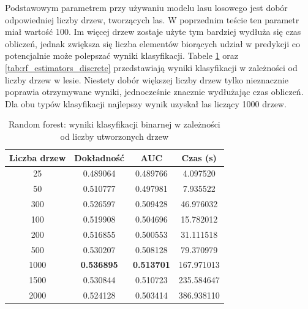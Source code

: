 \documentclass[a4paper, twoside, 11pt, openright]{article}
\begin{document}
Podstawowym parametrem przy używaniu modelu lasu losowego jest dobór odpowiedniej liczby drzew, tworzących las. W poprzednim teście ten parametr miał wartość 100. Im więcej drzew zostaje użyte tym bardziej wydłuża się czas obliczeń, jednak zwiększa się liczba elementów biorących udział w predykcji co potencjalnie może polepszać wyniki klasyfikacji. Tabele \ref{tab:rf_estimators_binary} oraz \ref{tab:rf_estimators_discrete} przedstawiają wyniki klasyfikacji w zależności od liczby drzew w lesie. Niestety dobór większej liczby drzew tylko nieznacznie poprawia otrzymywane wyniki, jednocześnie znacznie wydłużając czas obliczeń. Dla obu typów klasyfikacji najlepszy wynik uzyskał las liczący 1000 drzew.

\begin{table}[H]
    \centering
    \begin{tabular}{|c|c|c|c|}
    \hline
        \textbf{Liczba drzew} & \textbf{Dokładność} & \textbf{AUC} & \textbf{Czas (s)} \\ \hline
25         &  0.489064 &  0.489766 &    4.097520 \\ \hline
50         &  0.510777 &  0.497981 &    7.935522 \\ \hline
300        &  0.526597 &  0.509428 &   46.976032 \\ \hline
100        &  0.519908 &  0.504696 &   15.782012 \\ \hline
200        &  0.516855 &  0.500553 &   31.111518 \\ \hline
500        &  0.530207 &  0.508128 &   79.370979 \\ \hline
1000       &  \textbf{0.536895} &  \textbf{0.513701} &  167.971013 \\ \hline
1500       &  0.530844 &  0.510723 &  235.584647 \\ \hline
2000       &  0.524128 &  0.503414 &  386.938110 \\ \hline
    \end{tabular}
    \caption{Random forest: wyniki klasyfikacji binarnej w zależności od liczby utworzonych drzew}
    \label{tab:rf_estimators_binary}
\end{table}
\end{document}
